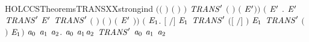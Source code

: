 \begin{SaveVerbatim}{HOLCCSTheoremsTRANSXXstrongind}
            \ensuremath{(}\ensuremath{(} \HOLSymConst{\ensuremath{=}} \HOLConst{\ensuremath{\tau}}\ensuremath{)} \HOLSymConst{\HOLTokenDisj{}} \ensuremath{(} \HOLSymConst{\ensuremath{=}}  \ensuremath{)} \HOLSymConst{\HOLTokenConj{}}  \HOLConst{\HOLTokenNotIn{}}  \HOLSymConst{\HOLTokenConj{}}   \HOLConst{\HOLTokenNotIn{}} \ensuremath{)} \HOLSymConst{\HOLTokenImp{}}
            \ensuremath{\HOLBoundVar{TRANS}\sp{\prime}} \ensuremath{(}  \ensuremath{)}  \ensuremath{(}  \ensuremath{\HOLBoundVar{E}\sp{\prime}}\ensuremath{)}\ensuremath{)} \HOLSymConst{\HOLTokenConj{}}
       \ensuremath{(}\HOLSymConst{\HOLTokenForall{}}  \ensuremath{\HOLBoundVar{E}\sp{\prime}} .
             \HOLTokenTransBegin{}\HOLTokenTransEnd \ensuremath{\HOLBoundVar{E}\sp{\prime}} \HOLSymConst{\HOLTokenConj{}} \ensuremath{\HOLBoundVar{TRANS}\sp{\prime}}   \ensuremath{\HOLBoundVar{E}\sp{\prime}} \HOLSymConst{\HOLTokenImp{}}
            \ensuremath{\HOLBoundVar{TRANS}\sp{\prime}} \ensuremath{(}  \ensuremath{)} \ensuremath{(}  \ensuremath{)} \ensuremath{(} \ensuremath{\HOLBoundVar{E}\sp{\prime}} \ensuremath{)}\ensuremath{)} \HOLSymConst{\HOLTokenConj{}}
       \ensuremath{(}\HOLSymConst{\HOLTokenForall{}}   \ensuremath{\HOLBoundVar{E}\sb{\mathrm{1}}}.
            \ensuremath{[}  \ensuremath{/}\ensuremath{]}  \HOLTokenTransBegin{}\HOLTokenTransEnd \ensuremath{\HOLBoundVar{E}\sb{\mathrm{1}}} \HOLSymConst{\HOLTokenConj{}} \ensuremath{\HOLBoundVar{TRANS}\sp{\prime}} \ensuremath{(}\ensuremath{[}  \ensuremath{/}\ensuremath{]} \ensuremath{)}  \ensuremath{\HOLBoundVar{E}\sb{\mathrm{1}}} \HOLSymConst{\HOLTokenImp{}}
            \ensuremath{\HOLBoundVar{TRANS}\sp{\prime}} \ensuremath{(}  \ensuremath{)}  \ensuremath{\HOLBoundVar{E}\sb{\mathrm{1}}}\ensuremath{)} \HOLSymConst{\HOLTokenImp{}}
       \HOLSymConst{\HOLTokenForall{}}\ensuremath{\HOLBoundVar{a}\sb{\mathrm{0}}} \ensuremath{\HOLBoundVar{a}\sb{\mathrm{1}}} \ensuremath{\HOLBoundVar{a}\sb{\mathrm{2}}}. \ensuremath{\HOLBoundVar{a}\sb{\mathrm{0}}} \HOLTokenTransBegin\ensuremath{\HOLBoundVar{a}\sb{\mathrm{1}}}\HOLTokenTransEnd \ensuremath{\HOLBoundVar{a}\sb{\mathrm{2}}} \HOLSymConst{\HOLTokenImp{}} \ensuremath{\HOLBoundVar{TRANS}\sp{\prime}} \ensuremath{\HOLBoundVar{a}\sb{\mathrm{0}}} \ensuremath{\HOLBoundVar{a}\sb{\mathrm{1}}} \ensuremath{\HOLBoundVar{a}\sb{\mathrm{2}}}
\end{SaveVerbatim}
